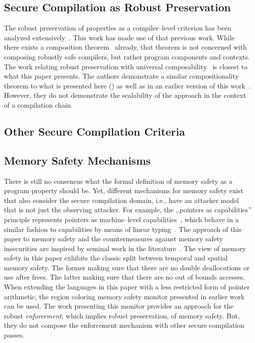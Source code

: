 \documentclass[utf8,acmsmall,review,screen,dvipsnames]{acmart}
\begin{document}
\subsection{Secure Compilation as Robust Preservation}\label{subsec:relw:seccomprtp}

The robust preservation of properties as a compiler--level criterion has been analyzed extensively~\cite{abate2019jour,patrignani2021rsc,abate2021extacc,patrignani2022universal,patrignani2019survey,kruse2022csc}.
This work has made use of that previous work.
While there exists a composition theorem~\cite{abate2019jour} already, that theorem is not concerned with composing robustly safe compilers, but rather program components and contexts.
The work relating robust preservation with universal composability~\cite{patrignani2022universal} is closest to what this paper presents.
The authors demonstrate a similar compositionality theorem to what is presented here () as well as in an earlier version of this work~\cite{kruse2022csc}.
However, they do not demonstrate the scalability of the approach in the context of a compilation chain.

\subsection{Other Secure Compilation Criteria}\label{subsec:relw:seccompcrit}



\subsection{Memory Safety Mechanisms}\label{subsec:relw:msmechs}

There is still no consensus what the formal definition of memory safety as a program property should be. %
Yet, different mechanisms for memory safety exist that also consider the secure compilation domain, i.e., have an attacker model that is not just the observing attacker.
For example, the ,,pointers as capabilities'' principle represents pointers as machine--level capabilities~\cite{korashy2021capableptrs}, which behave in a similar fashion to capabilities by means of  linear typing~\cite{morrisett2005L3}.
The approach of this paper to memory safety and the countermeasures against memory safety insecurities are inspired by seminal work in the literature~\cite{nagarakatte2009soft,nagarakatte2010cets}.
The view of memory safety in this paper exhibits the classic split between temporal and spatial memory safety.
The former making sure that there are no double deallocations or use after frees.
The latter making sure that there are no out of bounds accesses.
When extending the languages in this paper with a less restricted form of pointer arithmetic, the region coloring memory safety monitor presented in earlier work~\cite{michael2023mswasm} can be used.
The work presenting this monitor provides an approach for the robust {\em enforcement}, which implies robust preservation, of memory safety.
But, they do not compose the enforcement mechanism with other secure compilation passes.
\end{document}
